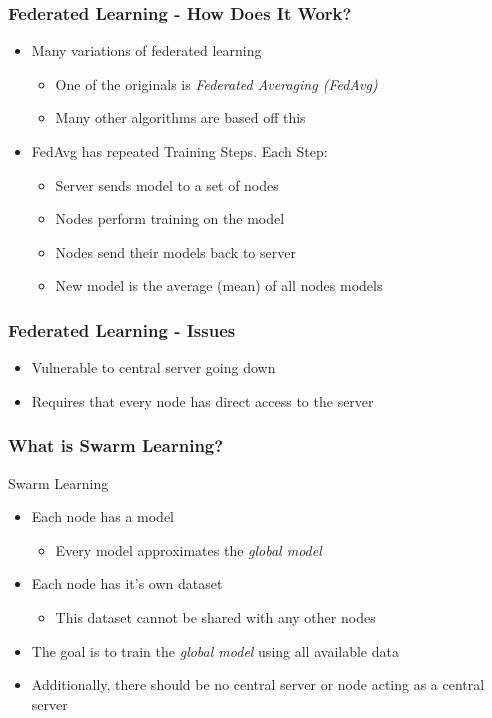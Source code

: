 \documentclass{beamer}
\begin{document}
	\begin{frame}
		\frametitle{Federated Learning - How Does It Work?}
		\begin{itemize}
			\item Many variations of federated learning
			\begin{itemize}
				\item One of the originals is \emph{Federated Averaging (FedAvg)}
				\item Many other algorithms are based off this
			\end{itemize}
			\item FedAvg has repeated Training Steps. Each Step:
			\begin{itemize}
				\item Server sends model to a set of nodes
				\item Nodes perform training on the model
				\item Nodes send their models back to server
				\item New model is the average (mean) of all nodes models
			\end{itemize}
		\end{itemize}
	\end{frame}

	\begin{frame}
		\frametitle{Federated Learning - Issues}
		\begin{itemize}
			\item Vulnerable to central server going down
			\item Requires that every node has direct access to the server
		\end{itemize}
	\end{frame}


	\begin{frame}
		\frametitle{What is Swarm Learning?}
		Swarm Learning
		\begin{itemize}
			\item Each node has a model
			\begin{itemize}
				\item Every model approximates the \emph{global model}
			\end{itemize}
			\item Each node has it's own dataset
			\begin{itemize}
				\item This dataset cannot be shared with any other nodes
			\end{itemize}
			\item The goal is to train the \emph{global model} using all available data
			\item Additionally, there should be no central server or node acting as a central server 
		\end{itemize}
	\end{frame}
	
\end{document}
